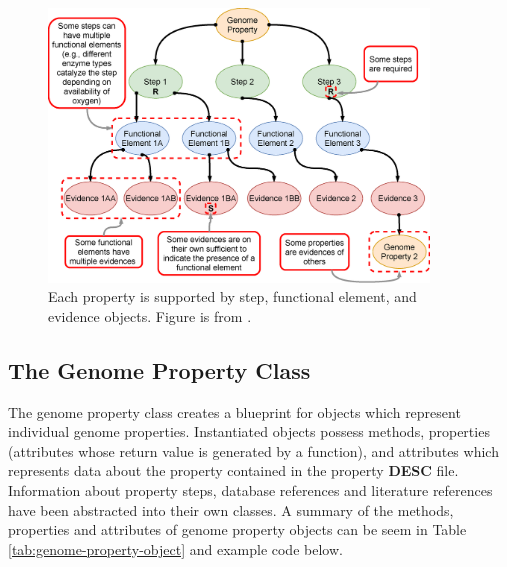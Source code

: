 \begin{figure}[!ht]
  \centering
	\includegraphics[width=0.90\textwidth]{media/Figure_1B.eps}
	 \caption{Each property is supported by step, functional element, and evidence objects. Figure is from \cite{bergstrand2019pygenprop}.}
	 \label{fig:property}
\end{figure}

\subsection{The Genome Property Class}

The genome property class creates a blueprint for objects which represent individual genome properties. Instantiated objects possess methods, properties (attributes whose return value is generated by a function), and attributes which represents data about the property contained in the property \textbf{DESC} file. Information about property steps, database references and literature references have been abstracted into their own classes. A summary of the methods, properties and attributes of genome property objects can be seem in Table \ref{tab:genome-property-object} and example code below.

